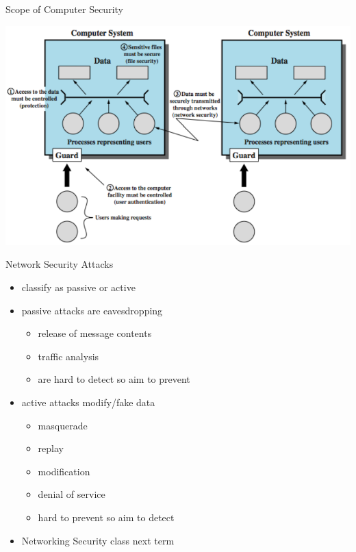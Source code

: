 \documentclass{beamer}
\begin{document}
\begin{frame}{Scope of Computer Security}
  \begin{center}
    \includegraphics[width=0.7\linewidth]{securityScope}
  \end{center}
\end{frame}

\begin{frame}{Network Security Attacks}
  \begin{itemize}
    \item  classify as passive or active 
    \item  passive attacks are eavesdropping 
      \begin{itemize}
      \item release of message contents 
      \item traffic analysis 
      \item are hard to detect so aim to prevent 
    \end{itemize}
    \item active attacks modify/fake data 
      \begin{itemize}
      \item masquerade 
      \item replay 
      \item modification 
      \item denial of service 
      \item hard to prevent so aim to detect 
    \end{itemize}
    \item  Networking Security class next term
    \end{itemize}
\end{frame}
\end{document}
